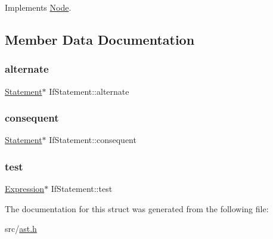 Implements \hyperlink{struct_node_a82f29420d0a38efcc370352528e94e9b}{Node}.



\subsection{Member Data Documentation}
\mbox{\label{struct_if_statement_ab0ee82460f6279444d526b2fff26584b}} 
\subsubsection{\texorpdfstring{alternate}{alternate}}
{\footnotesize\ttfamily \hyperlink{struct_statement}{Statement}$\ast$ If\+Statement\+::alternate}

\mbox{\label{struct_if_statement_a83d873df742779675de067315792ff8a}} 
\subsubsection{\texorpdfstring{consequent}{consequent}}
{\footnotesize\ttfamily \hyperlink{struct_statement}{Statement}$\ast$ If\+Statement\+::consequent}

\mbox{\label{struct_if_statement_ab7d44c6a4d1e70ab2d1053a2b076b8df}} 
\subsubsection{\texorpdfstring{test}{test}}
{\footnotesize\ttfamily \hyperlink{struct_expression}{Expression}$\ast$ If\+Statement\+::test}



The documentation for this struct was generated from the following file\+:\begin{DoxyCompactItemize}
\item 
src/\hyperlink{ast_8h}{ast.\+h}\end{DoxyCompactItemize}
